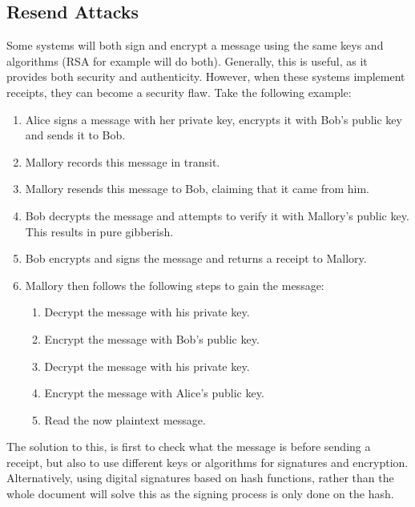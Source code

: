 		\subsection{Resend Attacks}
			Some systems will both sign and encrypt a message using the same keys and algorithms (RSA for example will do both).
			Generally, this is useful, as it provides both security and authenticity.
			However, when these systems implement receipts, they can become a security flaw.
			Take the following example:
			\begin{enumerate}
				\item Alice signs a message with her private key, encrypts it with Bob's public key and sends it to Bob.
				\item Mallory records this message in transit.
				\item Mallory resends this message to Bob, claiming that it came from him.
				\item Bob decrypts the message and attempts to verify it with Mallory's public key.
					This results in pure gibberish.
				\item Bob encrypts and signs the message and returns a receipt to Mallory.
				\item Mallory then follows the following steps to gain the message:
					\begin{enumerate}
						\item Decrypt the message with his private key.
						\item Encrypt the message with Bob's public key.
						\item Decrypt the message with his private key.
						\item Encrypt the message with Alice's public key.
						\item Read the now plaintext message.
					\end{enumerate}
			\end{enumerate}

			The solution to this, is first to check what the message is before sending a receipt, but also to use different keys or algorithms for signatures and encryption.
			Alternatively, using digital signatures based on hash functions, rather than the whole document will solve this as the signing process is only done on the hash.


